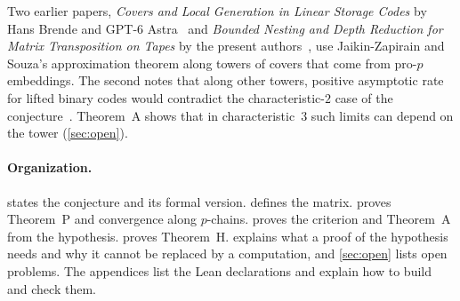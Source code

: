 Two earlier papers, \emph{Covers and Local Generation in Linear Storage Codes} by Hans Brende and GPT-6
Astra~\cite{Covers2026} and \emph{Bounded Nesting and Depth Reduction for Matrix Transposition on Tapes} by the present
authors~\cite{BoundedNesting2026}, use Jaikin-Zapirain
and Souza's approximation theorem along towers of covers that come from pro-$p$ embeddings. The second notes that along
other towers, positive asymptotic rate for lifted binary codes would contradict the characteristic-$2$ case of the
conjecture~\cite[Section~8.1]{BoundedNesting2026}. Theorem~A shows that in characteristic~$3$ such limits can depend on the
tower (\cref{sec:open}).

\paragraph{Organization.}  states the conjecture and its formal version.  defines
the matrix.  proves Theorem~P and convergence along $p$-chains.  proves the
criterion and Theorem~A from the hypothesis.  proves Theorem~H.  explains what a
proof of the hypothesis needs and why it cannot be replaced by a computation, and \cref{sec:open} lists open problems. The
appendices list the Lean declarations and explain how to build and check them.
